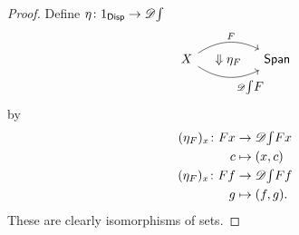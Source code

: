 \begin{proof}
    Define $\eta \colon 1_{\mathsf{Disp}} \to \mathscr D\textstyle{\int}$ 
    \[
    \begin{tikzcd}
        X
        \arrow[rr, "F", bend left, pos = 0.55]
        \arrow[rr, phantom, "\Downarrow \eta_F"]
        \arrow[rr, swap, "\mathscr D \Int F", bend right, pos = 0.6]
        &&
        \Span
    \end{tikzcd}
    \]
    by
    \begin{align*}
        (\eta_F)_x \colon Fx & \to \mathscr D \textstyle{\int} F x
        \\ 
        c & \mapsto (x,c)
        \\
        (\eta_F)_x \colon Ff & \to \mathscr D \textstyle{\int} F f
        \\ 
        g & \mapsto (f,g).
    \end{align*}
    These are clearly isomorphisms of sets.
    
    
    
\end{proof}
